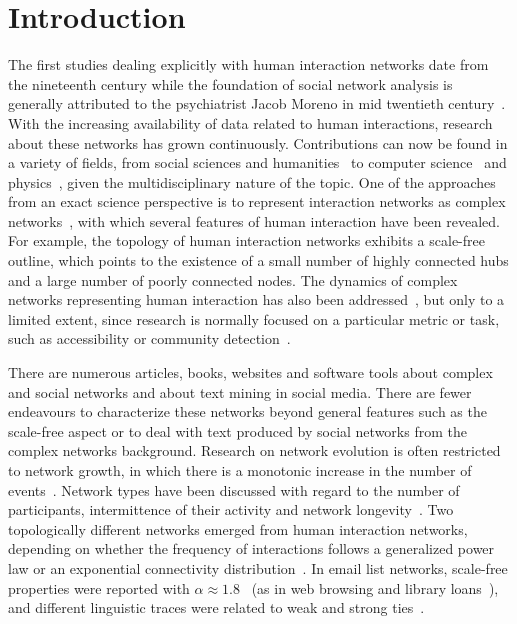 
\chapter{Introduction}\label{ch:int}

The first studies dealing explicitly with human interaction networks
date from the nineteenth century while the foundation of
social network analysis is generally attributed to the psychiatrist Jacob Moreno in mid twentieth century~\cite{moreno,newmanBook}.
With the increasing availability of data related to human interactions, research about these networks has grown continuously.
Contributions can now be found in a variety of fields, from social sciences and humanities~\cite{latour2013} to computer science~\cite{bird} and physics~\cite{barabasiHumanDyn,newmanFriendship}, given the multidisciplinary nature of the topic.
One of the approaches from an exact science perspective is to represent interaction networks as complex networks~\cite{barabasiHumanDyn,newmanFriendship}, with which 
several features of human interaction have been revealed.
For example, the topology of human interaction networks exhibits a scale-free outline,
which points to the existence of a small number of highly connected hubs and a large number of poorly connected nodes.
The dynamics of complex networks representing human interaction has also been addressed~\cite{barabasiEvo,newmanEvolving}, but only to a limited extent, since research is normally focused on a particular metric or task, such as accessibility or community detection~\cite{access,newmanModularity}. 

There are numerous articles, books, websites and software tools about complex and social networks and about text mining in social media.
There are fewer endeavours to characterize these networks beyond general features such as the scale-free 
aspect or to deal with text produced by social networks from the complex networks background.
Research on network evolution is often restricted to network growth, in which there is a monotonic increase in the number of events~\cite{barabasiEvo}.
Network types have been discussed with regard to the number of participants, intermittence of their activity and network longevity~\cite{barabasiEvo}. Two topologically different networks emerged from human interaction networks, depending on whether the frequency of interactions follows a generalized power law or an exponential connectivity distribution~\cite{barabasiTopologicalEv}. In email list networks, scale-free properties were reported with $\alpha \approx 1.8$~\cite{bird} (as in web browsing and library loans~\cite{barabasiHumanDyn}), and different linguistic traces were related to weak and strong ties~\cite{Gmane2}.

